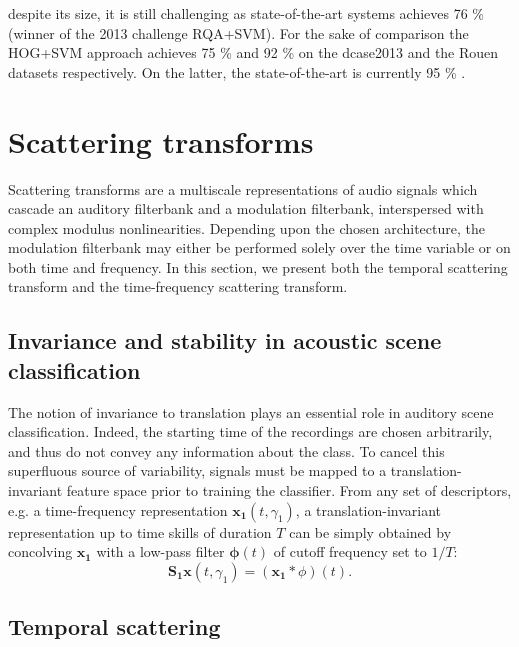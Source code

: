 \documentclass[journal]{IEEEtran}
\makeatletter
\newcommand*{\eg}{e.g.\@\xspace}
\makeatother
\begin{document}
despite its size, it is still challenging as state-of-the-art systems achieves 76 \% \cite{6701890} (winner of the 2013 challenge RQA+SVM). For the sake of comparison the HOG+SVM approach \cite{rakotomamonjy2015histogram} achieves 75 \% and 92 \% on the dcase2013 and the Rouen datasets respectively. On the latter, the state-of-the-art is currently 95 \% \cite{bisot2016acoustic}.

\section{Scattering transforms}
Scattering transforms are a multiscale representations of audio signals which cascade an auditory filterbank and a modulation filterbank, interspersed with complex modulus nonlinearities.
Depending upon the chosen architecture, the modulation filterbank may either be performed solely over the time variable or on both time and frequency.
In this section, we present both the temporal scattering transform and the time-frequency scattering transform.

\subsection{Invariance and stability in acoustic scene classification}
The notion of invariance to translation plays an essential role in auditory scene classification.
Indeed, the starting time of the recordings are chosen arbitrarily, and thus do not convey any information about the class.
To cancel this superfluous source of variability, signals must be mapped to a translation-invariant feature space prior to training the classifier.
From any set of descriptors, \eg a time-frequency representation $\boldsymbol{x_1}(t,\gamma_1)$,
a translation-invariant representation up to time skills of duration $T$ can be simply obtained
by concolving $\boldsymbol{x_1}$ with a low-pass filter $\boldsymbol{\phi}(t)$ of cutoff frequency
set to $1/T$:
\begin{equation}
\mathbf{S_1}\boldsymbol{x}(t, \gamma_1) = (\boldsymbol{x_1} \ast \phi) (t).
\end{equation}
\subsection{Temporal scattering}
\end{document}
